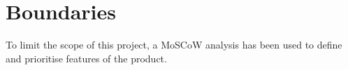 
\chapter{Boundaries}
\label{sec:Boundaries}
To limit the scope of this project, a MoSCoW analysis has been used to define and prioritise features of the product.



